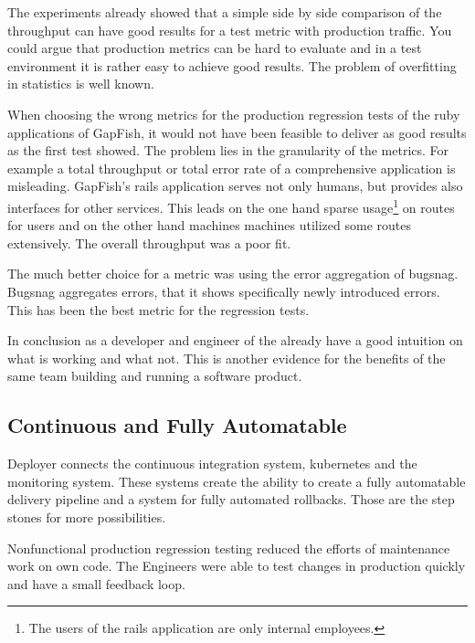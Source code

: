 The experiments already showed that a simple side by side comparison of the throughput can
have good results for a test metric with production traffic. You could argue that
production metrics can be hard to evaluate and in a test environment it is rather easy to
achieve good results. The problem of overfitting in statistics is well known.

When choosing the wrong metrics for the production regression tests of the ruby
applications of GapFish, it would not have been feasible to deliver as good results as the
first test showed. The problem lies in the granularity of the metrics. For example a total
throughput or total error rate of a comprehensive application is misleading. GapFish's
rails application serves not only humans, but provides also interfaces for other
services. This leads on the one hand sparse usage\footnote{The users of the rails
  application are only internal employees.} on routes for users and on the other hand
machines machines utilized some routes extensively. The overall throughput was a poor fit.

The much better choice for a metric was using the error aggregation of bugsnag. Bugsnag
aggregates errors, that it shows specifically newly introduced errors. This has been the
best metric for the regression tests.


In conclusion as a developer and engineer of the already have a good intuition on what is
working and what not. This is another evidence for the benefits of the same team building
and running a software product.

\subsection{Continuous and Fully Automatable}

Deployer connects the continuous integration system, kubernetes and the monitoring
system. These systems create the ability to create a fully automatable delivery pipeline
and a system for fully automated rollbacks. Those are the step stones for more
possibilities.

Nonfunctional production regression testing reduced the efforts of maintenance work on own
code. The Engineers were able to test changes in production quickly and have a small
feedback loop.

